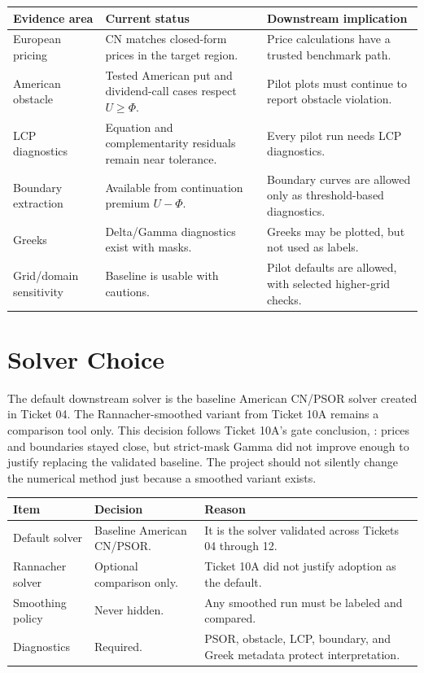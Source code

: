 \documentclass[11pt,a4paper]{article}
\newcommand{\code}[1]{\path{#1}}
\begin{document}
\begin{longtable}{L{0.31\textwidth} L{0.31\textwidth} L{0.28\textwidth}}
\toprule
Evidence area & Current status & Downstream implication \\
\midrule
\endhead
European pricing & CN matches closed-form prices in the target region. & Price calculations have a trusted benchmark path. \\
American obstacle & Tested American put and dividend-call cases respect \(U \ge \Phi\). & Pilot plots must continue to report obstacle violation. \\
LCP diagnostics & Equation and complementarity residuals remain near tolerance. & Every pilot run needs LCP diagnostics. \\
Boundary extraction & Available from continuation premium \(U-\Phi\). & Boundary curves are allowed only as threshold-based diagnostics. \\
Greeks & Delta/Gamma diagnostics exist with masks. & Greeks may be plotted, but not used as labels. \\
Grid/domain sensitivity & Baseline is usable with cautions. & Pilot defaults are allowed, with selected higher-grid checks. \\
\bottomrule
\end{longtable}

\section{Solver Choice}

The default downstream solver is the baseline American CN/PSOR solver created in Ticket 04. The
Rannacher-smoothed variant from Ticket 10A remains a comparison tool only. This decision follows
Ticket 10A's gate conclusion, \code{KEEP_BASELINE_FOR_NOW}: prices and boundaries stayed close,
but strict-mask Gamma did not improve enough to justify replacing the validated baseline. The
project should not silently change the numerical method just because a smoothed variant exists.

\begin{longtable}{L{0.25\textwidth} L{0.26\textwidth} L{0.38\textwidth}}
\toprule
Item & Decision & Reason \\
\midrule
\endhead
Default solver & Baseline American CN/PSOR. & It is the solver validated across Tickets 04 through 12. \\
Rannacher solver & Optional comparison only. & Ticket 10A did not justify adoption as the default. \\
Smoothing policy & Never hidden. & Any smoothed run must be labeled and compared. \\
Diagnostics & Required. & PSOR, obstacle, LCP, boundary, and Greek metadata protect interpretation. \\
\bottomrule
\end{longtable}
\end{document}
